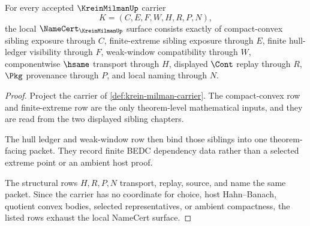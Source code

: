 \begin{theorem}
\label{thm:krein-milman-namecert-obligations}
For every accepted $\KreinMilmanUp$ carrier
$$
K=(C,E,F,W,H,R,P,N),
$$
the local $\NameCert_{\KreinMilmanUp}$ surface consists exactly of compact-convex sibling exposure through $C$, finite-extreme sibling exposure through $E$, finite hull-ledger visibility through $F$, weak-window compatibility through $W$, componentwise $\hsame$ transport through $H$, displayed $\Cont$ replay through $R$, $\Pkg$ provenance through $P$, and local naming through $N$.
\end{theorem}
\begin{proof}
Project the carrier of \autoref{def:krein-milman-carrier}. The compact-convex row and finite-extreme row are the only theorem-level mathematical inputs, and they are read from the two displayed sibling chapters.

The hull ledger and weak-window row then bind those siblings into one theorem-facing packet. They record finite BEDC dependency data rather than a selected extreme point or an ambient host proof.

The structural rows $H,R,P,N$ transport, replay, source, and name the same packet. Since the carrier has no coordinate for choice, host Hahn--Banach, quotient convex bodies, selected representatives, or ambient compactness, the listed rows exhaust the local NameCert surface.
\end{proof}


\begin{closurestatus}{\KreinMilmanUp}
  \theoryclosure{\seedClosure}
  \formalstatus{\unformalizedV}
\end{closurestatus}
